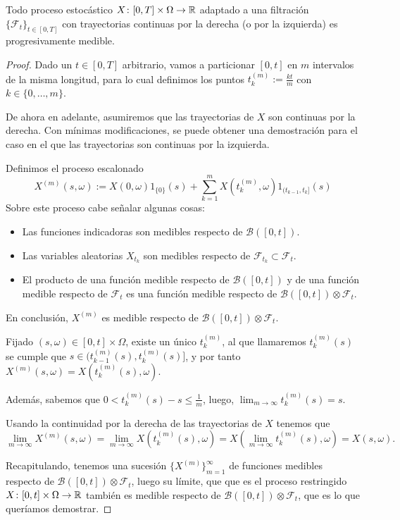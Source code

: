 \begin{proposicion}
    \label{prop:condicion_suf_progresividad}
    Todo proceso estocástico $X\colon[0,T]\times\Omega\to\mathbb{R}$ adaptado a una filtración $\{\mathcal{F}_t\}_{t\in[0,T]}$ con trayectorias continuas por la derecha (o por la izquierda) es progresivamente medible.
\end{proposicion}
\begin{proof}
    Dado un $t\in[0,T]$ arbitrario, vamos a particionar $[0,t]$ en $m$ intervalos de la misma longitud, para lo cual definimos los puntos $t_k^{(m)}:=\frac{kt}{m}$ con $k\in\{0,\dotsc,m\}$.

    De ahora en adelante, asumiremos que las trayectorias de $X$ son continuas por la derecha. Con mínimas modificaciones, se puede obtener una demostración para el caso en el que las trayectorias son continuas por la izquierda.

    Definimos el proceso escalonado
    \begin{equation}
        X^{(m)}(s,\omega):=X(0,\omega)1_{\{0\}}(s)+\sum_{k=1}^{m}X(t_{k}^{(m)},\omega)1_{(t_{k-1}, t_{k}]}(s)
    \end{equation}
    Sobre este proceso cabe señalar algunas cosas:
    \begin{itemize}
        \item Las funciones indicadoras son medibles respecto de $\mathcal{B}([0,t])$.
        \item Las variables aleatorias $X_{t_{k}}$ son medibles respecto de $\mathcal{F}_{t_k}\subset\mathcal{F}_t$.
        \item El producto de una función medible respecto de $\mathcal{B}([0,t])$ y de una función medible respecto de $\mathcal{F}_t$ es una función medible respecto de $\mathcal{B}([0,t])\otimes\mathcal{F}_t$.
    \end{itemize}
    En conclusión, $X^{(m)}$ es medible respecto de $\mathcal{B}([0,t])\otimes\mathcal{F}_t$.

    Fijado $(s,\omega)\in[0,t]\times\Omega$, existe un único $t_{k}^{(m)}$, al que llamaremos $t_{k}^{(m)}(s)$ se cumple que $s\in(t_{k-1}^{(m)}(s), t_{k}^{(m)}(s)]$, y por tanto $X^{(m)}(s,\omega)=X(t_{k}^{(m)}(s),\omega)$.

    Además, sabemos que $0<t_{k}^{(m)}(s)-s\leq \frac{1}{m}$, luego, $\lim_{m\to\infty}t_{k}^{(m)}(s)=s$.

    Usando la continuidad por la derecha de las trayectorias de $X$ tenemos que
    \begin{equation}
        \lim_{m\to\infty}X^{(m)}(s,\omega)=\lim_{m\to\infty}X\left(t_{k}^{(m)}(s),\omega\right)=X\left(\lim_{m\to\infty}t_{k}^{(m)}(s),\omega\right)=X(s,\omega)\text{. }
    \end{equation}

    Recapitulando, tenemos una sucesión $\{X^{(m)}\}_{m=1}^{\infty}$ de funciones medibles respecto de $\mathcal{B}([0,t])\otimes\mathcal{F}_t$, luego su límite, que que es el proceso restringido $X\colon[0,t]\times\Omega\to\mathbb{R}$ también es medible respecto de $\mathcal{B}([0,t])\otimes\mathcal{F}_t$, que es lo que queríamos demostrar.
\end{proof}
